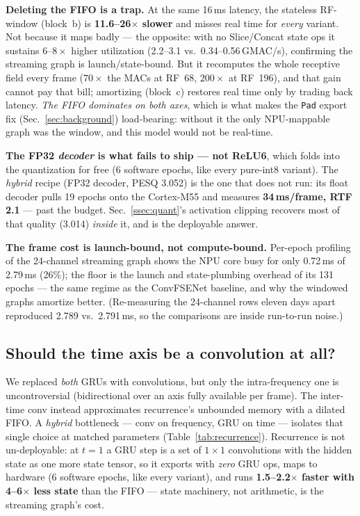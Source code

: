 \documentclass{article}
\begin{document}
\textbf{Deleting the FIFO is a trap.} At the same 16\,ms latency, the stateless
RF-window (block~b) is \textbf{11.6--26$\times$ slower} and misses real time for
\emph{every} variant. Not because it maps badly --- the opposite: with no
Slice/Concat state ops it sustains $6\text{--}8\times$ higher utilization
(2.2--3.1 vs.\ 0.34--0.56\,GMAC/s), confirming the streaming graph is
launch/state-bound. But it recomputes the whole receptive field every frame
($70\times$ the MACs at RF~68, $200\times$ at RF~196), and that gain cannot pay
that bill; amortizing (block~c) restores real time only by trading back
latency. \emph{The FIFO dominates on both axes}, which is what makes the
\texttt{Pad} export fix (Sec.~\ref{sec:background}) load-bearing: without it the
only NPU-mappable graph was the window, and this model would not be real-time.

\textbf{The FP32 \emph{decoder} is what fails to ship --- not ReLU6}, which
folds into the quantization for free (6 software epochs, like every pure-int8
variant). The \emph{hybrid} recipe (FP32 decoder, PESQ 3.052) is the one that
does not run: its float decoder pulls 19 epochs onto the Cortex-M55 and
measures \textbf{34\,ms/frame, RTF 2.1} --- past the budget.
Sec.~\ref{ssec:quant}'s activation clipping recovers most of that quality
(3.014) \emph{inside} it, and is the deployable answer.

\textbf{The frame cost is launch-bound, not compute-bound.} Per-epoch
profiling of the 24-channel streaming graph shows the NPU core busy for only
0.72\,ms of 2.79\,ms (26\%); the floor is the launch and state-plumbing
overhead of its 131 epochs --- the same regime as the ConvFSENet baseline, and
why the windowed graphs amortize better. (Re-measuring the 24-channel rows
eleven days apart reproduced 2.789 vs.\ 2.791\,ms, so the comparisons are
inside run-to-run noise.)

\subsection{Should the time axis be a convolution at all?}
\label{ssec:recurrence}

We replaced \emph{both} GRUs with convolutions, but only the intra-frequency
one is uncontroversial (bidirectional over an axis fully available per frame).
The inter-time conv instead approximates recurrence's unbounded memory with a
dilated FIFO. A \emph{hybrid} bottleneck --- conv on frequency, GRU on time ---
isolates that single choice at matched parameters (Table~\ref{tab:recurrence}).
Recurrence is not un-deployable: at $t{=}1$ a GRU step is a set of $1\times1$
convolutions with the hidden state as one more state tensor, so it exports with
\emph{zero} GRU ops, maps to hardware (6 software epochs, like every variant),
and runs \textbf{1.5--2.2$\times$ faster with 4--6$\times$ less state} than the
FIFO --- state machinery, not arithmetic, is the streaming graph's cost.
\end{document}
